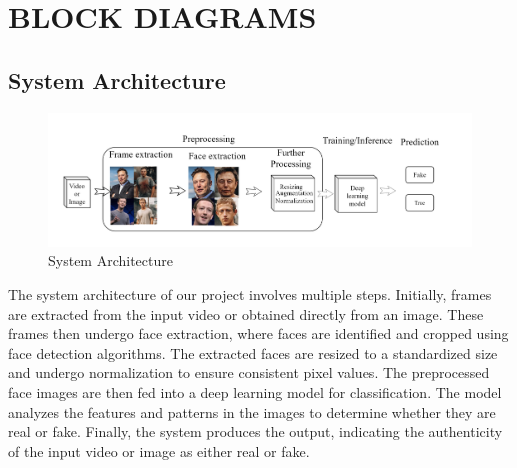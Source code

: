 \section{BLOCK DIAGRAMS}
\subsection{System Architecture}
\begin{figure}[h]
    \centering
    \includegraphics[width= 6.5in ]{img/systemachitecture.drawio.png}
    \caption{System Architecture}

\end{figure}
\justify
The system architecture of our project involves multiple steps. Initially, frames are extracted from the input video or obtained directly from an image. These frames then undergo face extraction, where faces are identified and cropped using face detection algorithms. The extracted faces are resized to a standardized size and undergo normalization to ensure consistent pixel values. The preprocessed face images are then fed into a deep learning model for classification. The model analyzes the features and patterns in the images to determine whether they are real or fake. Finally, the system produces the output, indicating the authenticity of the input video or image as either real or fake.
